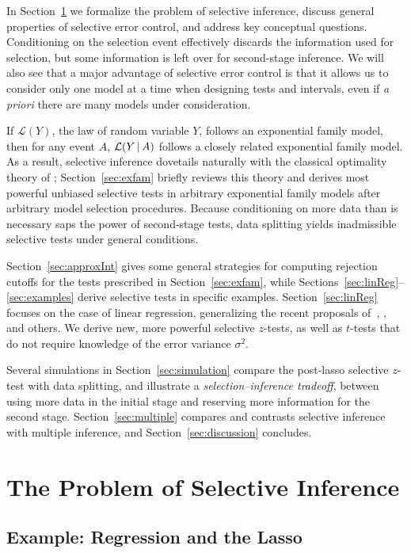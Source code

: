 \documentclass{article}
\theoremstyle{definition}
\newcommand{\cL}{\mathcal{L}}
\newcommand{\sampOrData}{data }
\begin{document}
In Section~\ref{sec:selInf} we formalize the problem of selective inference, discuss general properties of selective error control, and address key conceptual questions. Conditioning on the selection event effectively discards the information used for selection, but some information is left over for second-stage inference. We will also see that a major advantage of selective error control is that it allows us to consider only one model at a time when designing tests and intervals, even if {\em a priori} there are many models under consideration.

If $\cL(Y)$, the law of random variable $Y$, follows an exponential family model, then for any event $A$, $\cL(Y \gv A)$ follows a closely related exponential family model. As a result, selective inference dovetails naturally with the classical optimality theory of \citet{lehmann1955completeness}; Section~\ref{sec:exfam} briefly reviews this theory and derives most powerful unbiased selective tests in arbitrary exponential family models after arbitrary model selection procedures. Because conditioning on more data than is necessary saps the power of second-stage tests, \sampOrData splitting yields inadmissible selective tests under general conditions.

Section~\ref{sec:approxInt} gives some general strategies for
computing rejection cutoffs for the tests prescribed in Section~\ref{sec:exfam}, while Sections~\ref{sec:linReg}--\ref{sec:examples} derive selective tests in specific examples. Section~\ref{sec:linReg} focuses on the case of linear regression, generalizing the recent proposals of~\citet{taylor2014post}, \citet{lee2013exact}, and others. We
derive new, more powerful selective $z$-tests, as well as $t$-tests that do not require knowledge of the error variance $\sigma^2$.

Several simulations in Section~\ref{sec:simulation} compare the post-lasso selective $z$-test with \sampOrData splitting, and illustrate a {\em selection--inference tradeoff}, between using more data in the initial stage and reserving more information for the second stage. Section~\ref{sec:multiple} compares and contrasts selective inference with multiple inference, and Section~\ref{sec:discussion} concludes.

\section{The Problem of Selective Inference}\label{sec:selInf}

\subsection{Example: Regression and the Lasso}\label{sec:lassoRegression}
\end{document}
